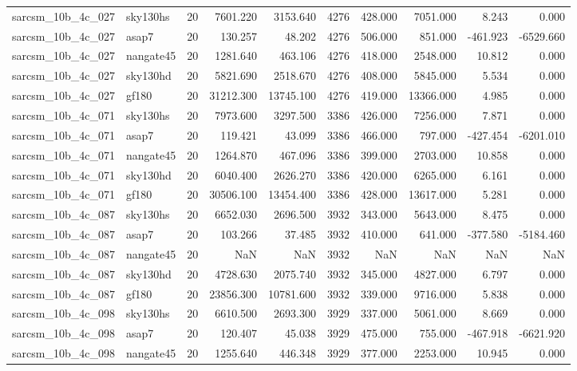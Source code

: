 \begin{longtable}{llrrrrrrrr}
sarcsm\_10b\_4c\_027 & sky130hs & 20 & 7601.220 & 3153.640 & 4276 & 428.000 & 7051.000 & 8.243 & 0.000 \\
sarcsm\_10b\_4c\_027 & asap7 & 20 & 130.257 & 48.202 & 4276 & 506.000 & 851.000 & -461.923 & -6529.660 \\
sarcsm\_10b\_4c\_027 & nangate45 & 20 & 1281.640 & 463.106 & 4276 & 418.000 & 2548.000 & 10.812 & 0.000 \\
sarcsm\_10b\_4c\_027 & sky130hd & 20 & 5821.690 & 2518.670 & 4276 & 408.000 & 5845.000 & 5.534 & 0.000 \\
sarcsm\_10b\_4c\_027 & gf180 & 20 & 31212.300 & 13745.100 & 4276 & 419.000 & 13366.000 & 4.985 & 0.000 \\
sarcsm\_10b\_4c\_071 & sky130hs & 20 & 7973.600 & 3297.500 & 3386 & 426.000 & 7256.000 & 7.871 & 0.000 \\
sarcsm\_10b\_4c\_071 & asap7 & 20 & 119.421 & 43.099 & 3386 & 466.000 & 797.000 & -427.454 & -6201.010 \\
sarcsm\_10b\_4c\_071 & nangate45 & 20 & 1264.870 & 467.096 & 3386 & 399.000 & 2703.000 & 10.858 & 0.000 \\
sarcsm\_10b\_4c\_071 & sky130hd & 20 & 6040.400 & 2626.270 & 3386 & 420.000 & 6265.000 & 6.161 & 0.000 \\
sarcsm\_10b\_4c\_071 & gf180 & 20 & 30506.100 & 13454.400 & 3386 & 428.000 & 13617.000 & 5.281 & 0.000 \\
sarcsm\_10b\_4c\_087 & sky130hs & 20 & 6652.030 & 2696.500 & 3932 & 343.000 & 5643.000 & 8.475 & 0.000 \\
sarcsm\_10b\_4c\_087 & asap7 & 20 & 103.266 & 37.485 & 3932 & 410.000 & 641.000 & -377.580 & -5184.460 \\
sarcsm\_10b\_4c\_087 & nangate45 & 20 & NaN & NaN & 3932 & NaN & NaN & NaN & NaN \\
sarcsm\_10b\_4c\_087 & sky130hd & 20 & 4728.630 & 2075.740 & 3932 & 345.000 & 4827.000 & 6.797 & 0.000 \\
sarcsm\_10b\_4c\_087 & gf180 & 20 & 23856.300 & 10781.600 & 3932 & 339.000 & 9716.000 & 5.838 & 0.000 \\
sarcsm\_10b\_4c\_098 & sky130hs & 20 & 6610.500 & 2693.300 & 3929 & 337.000 & 5061.000 & 8.669 & 0.000 \\
sarcsm\_10b\_4c\_098 & asap7 & 20 & 120.407 & 45.038 & 3929 & 475.000 & 755.000 & -467.918 & -6621.920 \\
sarcsm\_10b\_4c\_098 & nangate45 & 20 & 1255.640 & 446.348 & 3929 & 377.000 & 2253.000 & 10.945 & 0.000 \\

\end{longtable}
